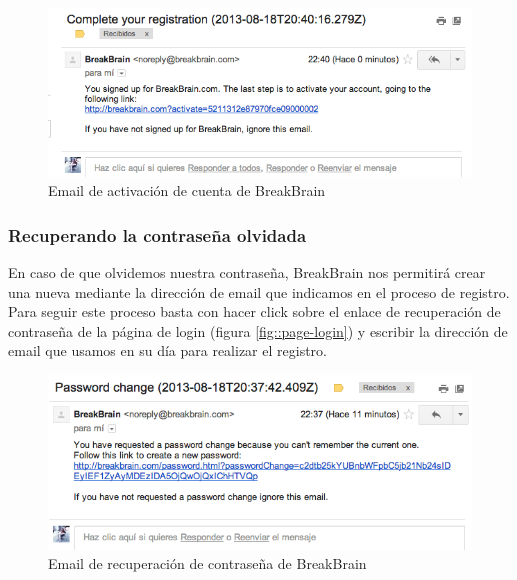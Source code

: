 \begin{figure}[h]
  \begin{center}
    \includegraphics[width=\textwidth]{./images/register-email.png}
  \end{center}  
  \caption{Email de activación de cuenta de BreakBrain}
  \label{fig::register-email}
\end{figure}

\subsubsection{Recuperando la contraseña olvidada}

En caso de que olvidemos nuestra contraseña, BreakBrain nos permitirá crear una nueva mediante la dirección de email que indicamos en el proceso de registro. Para seguir este proceso basta con hacer click sobre el enlace de recuperación de contraseña de la página de login (figura \ref{fig::page-login}) y escribir la dirección de email que usamos en su día para realizar el registro.

\begin{figure}[h]
  \begin{center}
    \includegraphics[width=\textwidth]{./images/password-change.png}
  \end{center}  
  \caption{Email de recuperación de contraseña de BreakBrain}
  \label{fig::recover-email}
\end{figure}

